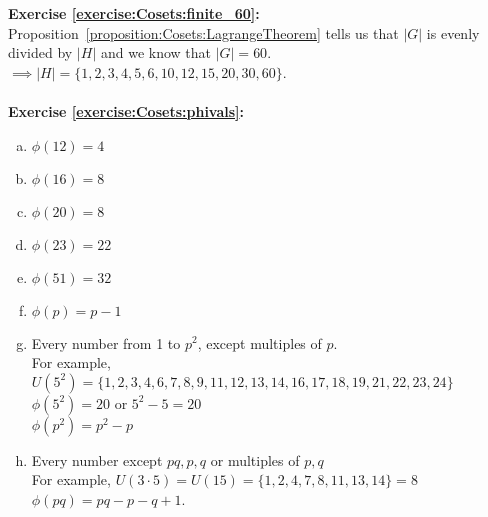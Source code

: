 \noindent\textbf{Exercise \ref{exercise:Cosets:finite_60}:}
\\
Proposition~\ref{proposition:Cosets:LagrangeTheorem} tells us that $|G|$ is evenly divided by $|H|$ and we know that $|G| = 60$.
\\
$\implies |H| = \{1, 2, 3, 4, 5, 6, 10, 12, 15, 20, 30, 60\}$.
\\
\\
\noindent\textbf{Exercise \ref{exercise:Cosets:phivals}:}
\begin{enumerate}[(a)]
\item
$\phi(12) = 4$ 

\item
$\phi(16) = 8$
 
\item
$\phi(20) = 8$

\item
$\phi(23) = 22$

\item
$\phi(51) = 32$

\item
$\phi(p) = p - 1$

\item
Every number from 1 to $p^2$, except multiples of $p$. 
\\
For example, $U(5^2) = \{1, 2, 3, 4, 6, 7, 8, 9, 11, 12, 13, 14, 16, 17, 18, 19, 21, 22, 23, 24\}$
\\
$\phi(5^2) = 20$ or $5^2 - 5 = 20$
\\ 
$\phi(p^2) = p^2 - p$


\item
Every number except $pq, p, q$ or multiples of $p, q$
\\
For example, $U(3 \cdot 5) = U(15) = \{1, 2, 4, 7, 8, 11, 13, 14\} = 8$
\\
$\phi(pq) = pq - p - q + 1$.
\end{enumerate}

